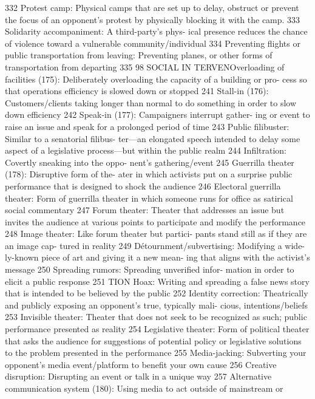 \documentclass[twoside,a4paper,12pt,fleqn,openany]{extbook}
\begin{document}
 332
Protest camp: Physical camps that are set up
to delay, obstruct or prevent the focus of an
opponent’s protest by physically blocking it
with the camp.
 333
Solidarity accompaniment: A third-party’s phys-
ical presence reduces the chance of violence
toward a vulnerable community/individual 334
Preventing flights or public transportation
from leaving: Preventing planes, or other forms
of transportation from departing
 335
98
SOCIAL IN TERVENOverloading of facilities (175): Deliberately
overloading the capacity of a building or pro-
cess so that operations efficiency is slowed
down or stopped
 241
Stall-in (176): Customers/clients taking longer
than normal to do something in order to slow
down efficiency
 242
Speak-in (177): Campaigners interrupt gather-
ing or event to raise an issue and speak for a
prolonged period of time
 243
Public filibuster: Similar to a senatorial filibus-
ter—an elongated speech intended to delay
some aspect of a legislative process—but
within the public realm
 244
Infiltration: Covertly sneaking into the oppo-
nent’s gathering/event
 245
Guerrilla theater (178): Disruptive form of the-
ater in which activists put on a surprise public
performance that is designed to shock the
audience
 246
Electoral guerrilla theater: Form of guerrilla
theater in which someone runs for office as
satirical social commentary
 247
Forum theater: Theater that addresses an issue
but invites the audience at various points to
participate and modify the performance 248
Image theater: Like forum theater but partici-
pants stand still as if they are an image cap-
tured in reality
 249
Détournment/subvertising: Modifying a wide-
ly-known piece of art and giving it a new mean-
ing that aligns with the activist’s message 250
Spreading rumors: Spreading unverified infor-
mation in order to elicit a public response 251
TION
Hoax: Writing and spreading a false news
story that is intended to be believed by the
public
 252
Identity correction: Theatrically and publicly
exposing an opponent’s true, typically mali-
cious, intentions/beliefs
 253
Invisible theater: Theater that does not seek
to be recognized as such; public performance
presented as reality
 254
Legislative theater: Form of political theater
that asks the audience for suggestions of
potential policy or legislative solutions to the
problem presented in the performance 255
Media-jacking: Subverting your opponent’s
media event/platform to benefit your own
cause
 256
Creative disruption: Disrupting an event or talk
in a unique way
 257
Alternative communication system (180):
Using media to act outside of mainstream or
\end{document}
